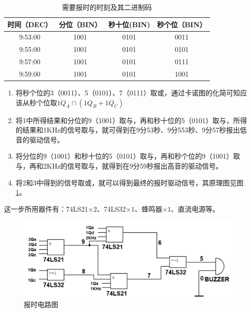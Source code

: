 \documentclass[12pt]{article}
\begin{document}
\begin{table}[htbp]
  \centering
  \caption{需要报时的时刻及其二进制码}
    \begin{tabular}{cccc}
    \hline
    时间（DEC） & 分位（BIN） & 秒十位(BIN) & 秒个位（BIN） \\
    \hline
    9:53:00 & 1001 & 0101 & 0011 \\
    9:55:00 & 1001 & 0101 & 0101 \\
    9:57:00 & 1001 & 0101 & 0111 \\
    9:59:00 & 1001 & 0101 & 1001 \\
    \hline
    \end{tabular}%
  \label{tab:time}%
\end{table}%
\begin{enumerate}
\item 将秒个位的3（0011）、5（0101）、7（0111）取或，通过卡诺图的化简可知应该从秒个位取$1Q_A\cap(1Q_B+1Q_C)$
\item 将1中所得结果和分位的9（1001）取与，再和秒十位的5（0101）取与，所得的结果和1KHz的信号取与，就可得到在9分53秒、9分553秒、9分57秒报出低音的驱动信号。
\item  将分位的9（1001）和秒十位的5（0101）取与，再和秒个位的9（1001）取与，再和2KHz的信号取与，就得到在9分59秒报出高音的驱动信号。
\item 将2和3中得到的信号取或，就可以得到最终的报时驱动信号，其原理图见图\ref{fig:baoshi}。
\end{enumerate}
这一步所用器件有：74LS21$\times2$、74LS32$\times1$、蜂鸣器$\times1$、直流电源等。
\begin{figure}[h]
\centering
\includegraphics[width=\textwidth]{TIM20180922134052.png}
\caption{报时电路图}
  \label{fig:baoshi}
\end{figure}
\end{document}
